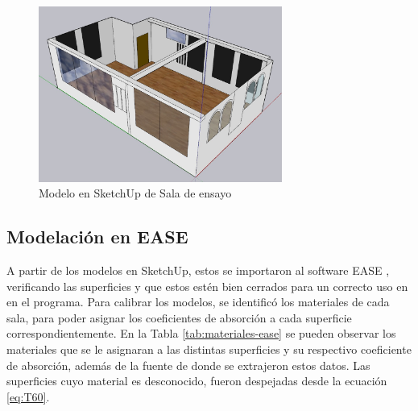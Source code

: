 \begin{figure}[H]
    \centering
    \includegraphics[width=8cm]{Imagenes/Modelacion/Sala ensayo Sketchup.jpg}
    \caption{Modelo en SketchUp de Sala de ensayo}
    \label{fig: sketchup sala de ensayo}
\end{figure}

\subsection{Modelación en EASE}
A partir de los modelos en SketchUp, estos se importaron al software EASE \cite{ease}, verificando las superficies y que estos estén bien cerrados para un correcto uso en en el programa. Para calibrar los modelos, se identificó los materiales de cada sala, para poder asignar los coeficientes de absorción a cada superficie correspondientemente. En la Tabla \ref{tab:materiales-ease} se pueden observar los materiales que se le asignaran a las distintas superficies y su respectivo coeficiente de absorción, además de la fuente de donde se extrajeron estos datos. Las superficies cuyo material es desconocido, fueron despejadas desde la ecuación \ref{eq:T60}.


